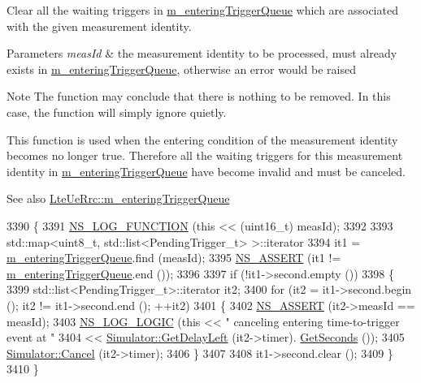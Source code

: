 Clear all the waiting triggers in \hyperlink{classns3_1_1LteUeRrc_a06a26d8b08a9c635d7fa6ff8381fff4f}{m\+\_\+entering\+Trigger\+Queue} which are associated with the given measurement identity. 


\begin{DoxyParams}{Parameters}
{\em meas\+Id} & the measurement identity to be processed, must already exists in \hyperlink{classns3_1_1LteUeRrc_a06a26d8b08a9c635d7fa6ff8381fff4f}{m\+\_\+entering\+Trigger\+Queue}, otherwise an error would be raised\\
\hline
\end{DoxyParams}
\begin{DoxyNote}{Note}
The function may conclude that there is nothing to be removed. In this case, the function will simply ignore quietly.
\end{DoxyNote}
This function is used when the entering condition of the measurement identity becomes no longer true. Therefore all the waiting triggers for this measurement identity in \hyperlink{classns3_1_1LteUeRrc_a06a26d8b08a9c635d7fa6ff8381fff4f}{m\+\_\+entering\+Trigger\+Queue} have become invalid and must be canceled.

\begin{DoxySeeAlso}{See also}
\hyperlink{classns3_1_1LteUeRrc_a06a26d8b08a9c635d7fa6ff8381fff4f}{Lte\+Ue\+Rrc\+::m\+\_\+entering\+Trigger\+Queue} 
\end{DoxySeeAlso}

\begin{DoxyCode}
3390 \{
3391   \hyperlink{log-macros-disabled_8h_a90b90d5bad1f39cb1b64923ea94c0761}{NS\_LOG\_FUNCTION} (\textcolor{keyword}{this} << (uint16\_t) measId);
3392 
3393   std::map<uint8\_t, std::list<PendingTrigger\_t> >::iterator
3394     it1 = \hyperlink{classns3_1_1LteUeRrc_a06a26d8b08a9c635d7fa6ff8381fff4f}{m\_enteringTriggerQueue}.find (measId);
3395   \hyperlink{assert_8h_a6dccdb0de9b252f60088ce281c49d052}{NS\_ASSERT} (it1 != \hyperlink{classns3_1_1LteUeRrc_a06a26d8b08a9c635d7fa6ff8381fff4f}{m\_enteringTriggerQueue}.end ());
3396 
3397   \textcolor{keywordflow}{if} (!it1->second.empty ())
3398     \{
3399       std::list<PendingTrigger\_t>::iterator it2;
3400       \textcolor{keywordflow}{for} (it2 = it1->second.begin (); it2 != it1->second.end (); ++it2)
3401         \{
3402           \hyperlink{assert_8h_a6dccdb0de9b252f60088ce281c49d052}{NS\_ASSERT} (it2->measId == measId);
3403           \hyperlink{group__logging_ga88acd260151caf2db9c0fc84997f45ce}{NS\_LOG\_LOGIC} (\textcolor{keyword}{this} << \textcolor{stringliteral}{" canceling entering time-to-trigger event at "}
3404                              << \hyperlink{classns3_1_1Simulator_af2c7b4285454aa5062bd2df2bb7a7ab9}{Simulator::GetDelayLeft} (it2->timer).
      \hyperlink{classns3_1_1Time_a8f20d5c3b0902d7b4320982f340b57c8}{GetSeconds} ());
3405           \hyperlink{classns3_1_1Simulator_a1b903a62d6117ef28f7ba3c6500689bf}{Simulator::Cancel} (it2->timer);
3406         \}
3407 
3408       it1->second.clear ();
3409     \}
3410 \}
\end{DoxyCode}


